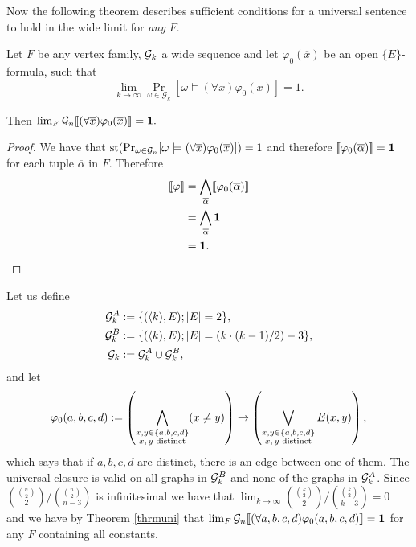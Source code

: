 Now the following theorem describes sufficient conditions for a universal sentence to hold in the wide limit for \textit{any} $F$.

\begin{thrm}\label{thrmuni}
Let $F$ be any vertex family, $\mathcal{G}_k$ a wide sequence and let $\varphi_0(\overline x)$ be an open $\{E\}$-formula, such that
\[\lim_{k\to\infty}\Pr_{\omega\in\mathcal{G}_k}[\omega\models(\forall \overline x)\varphi_0(\overline x)]=1.\]

Then $\lim_F \mathcal{G}_n [\![(\forall \overline x)\varphi_0(\overline x)]\!]=\textbf{1}.$


\end{thrm}

\begin{proof}
We have that $\text{st}(\Pr_{\omega\in\mathcal{G}_n}[\omega\models(\forall \overline x)\varphi_0(\overline x)])=1$ and therefore $[\![\varphi_0(\overline\alpha)]\!]=\textbf{1}$ for each tuple $\overline\alpha$ in $F$. Therefore
\begin{align}
[\![\varphi]\!]&=\bigwedge_{\overline\alpha}[\![\varphi_0(\overline\alpha)]\!]\\
&=\bigwedge_{\overline\alpha}\textbf{1}\\
&=\textbf{1}.
\end{align}
\end{proof}

\begin{exam}
Let us define
\begin{align}
\mathcal{G}_k^{A}&:=\{(\langle k),E);\left|{E}\right|=2\},\\
\mathcal{G}_k^{B}&:=\{(\langle k),E);\left|{E}\right|=(k\cdot(k-1)/2)-3\},\\
\mathcal{G}_k&:=\mathcal{G}_k^{A}\cup\mathcal{G}_k^{B},
\end{align}
and let 
\[\varphi_0(a,b,c,d):=\left(\bigwedge_{\substack{x, y\in\{a,b,c,d\}\\\text{$x,y$ distinct}}}(x\not=y)\right)\to\left(\bigvee_{\substack{x, y\in\{a,b,c,d\}\\\text{$x,y$ distinct}}}E(x,y)\right),\]
which says that if $a,b,c,d$ are distinct, there is an edge between one of them. The universal closure is valid on all graphs in $\mathcal{G}_k^B$ and none of the graphs in $\mathcal{G}_k^A$. Since $\binom{\binom{n}{2}}{2}/\binom{\binom{n}{2}}{n-3}$ is infinitesimal we have that $\lim_{k\to\infty} \binom{\binom{k}{2}}{2}/\binom{\binom{k}{2}}{k-3}=0$ and we have by Theorem \ref{thrmuni} that $\lim_F \mathcal{G}_n [\![(\forall a,b,c,d)\varphi_0(a,b,c,d)]\!]=\textbf{1}$ for any $F$ containing all constants.
\end{exam}

